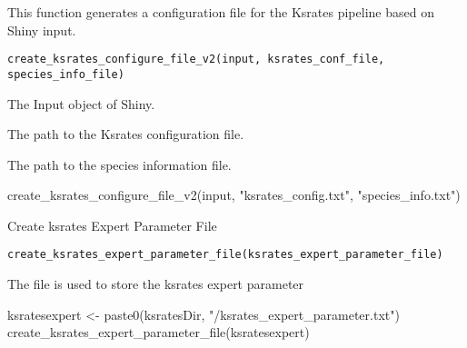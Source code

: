 \documentclass[a4paper]{book}
\begin{document}
%
\begin{Description}\relax
This function generates a configuration file for the Ksrates pipeline based on Shiny input.
\end{Description}
%
\begin{Usage}
\begin{verbatim}
create_ksrates_configure_file_v2(input, ksrates_conf_file, species_info_file)
\end{verbatim}
\end{Usage}
%
\begin{Arguments}
\begin{ldescription}
\item[\code{input}] The Input object of Shiny.

\item[\code{ksrates\_conf\_file}] The path to the Ksrates configuration file.

\item[\code{species\_info\_file}] The path to the species information file.
\end{ldescription}
\end{Arguments}
%
\begin{Examples}
\begin{ExampleCode}
create_ksrates_configure_file_v2(input, "ksrates_config.txt", "species_info.txt")
\end{ExampleCode}
\end{Examples}
%
\begin{Description}\relax
Create ksrates Expert Parameter File
\end{Description}
%
\begin{Usage}
\begin{verbatim}
create_ksrates_expert_parameter_file(ksrates_expert_parameter_file)
\end{verbatim}
\end{Usage}
%
\begin{Arguments}
\begin{ldescription}
\item[\code{ksrates\_expert\_parameter\_file}] The file is used to store the ksrates expert parameter
\end{ldescription}
\end{Arguments}
%
\begin{Examples}
\begin{ExampleCode}
ksratesexpert <- paste0(ksratesDir, "/ksrates_expert_parameter.txt")
create_ksrates_expert_parameter_file(ksratesexpert)
\end{ExampleCode}
\end{Examples}
\end{document}
